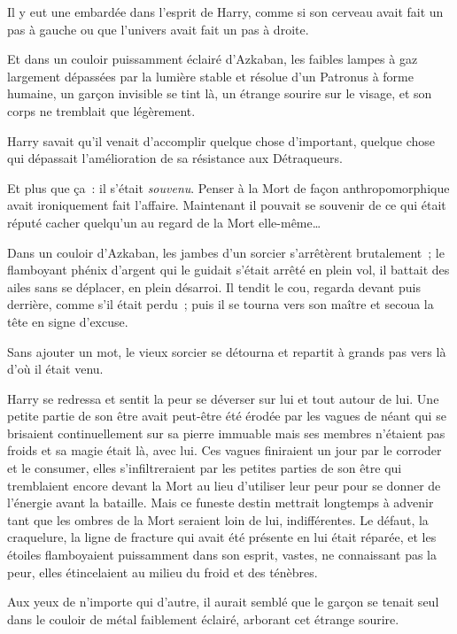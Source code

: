 Il y eut une embardée dans l'esprit de Harry, comme si son cerveau avait fait un pas à gauche ou que l'univers avait fait un pas à droite.

Et dans un couloir puissamment éclairé d'Azkaban, les faibles lampes à gaz largement dépassées par la lumière stable et résolue d'un Patronus à forme humaine, un garçon invisible se tint là, un étrange sourire sur le visage, et son corps ne tremblait que légèrement.

Harry savait qu'il venait d'accomplir quelque chose d'important, quelque chose qui dépassait l'amélioration de sa résistance aux Détraqueurs.

Et plus que ça~: il s'était \emph{souvenu}.
Penser à la Mort de façon anthropomorphique avait ironiquement fait l'affaire.
Maintenant il pouvait se souvenir de ce qui était réputé cacher quelqu'un au regard de la Mort elle-même…

\later

Dans un couloir d'Azkaban, les jambes d'un sorcier s'arrêtèrent brutalement~; le flamboyant phénix d'argent qui le guidait s'était arrêté en plein vol, il battait des ailes sans se déplacer, en plein désarroi.
Il tendit le cou, regarda devant puis derrière, comme s'il était perdu~; puis il se tourna vers son maître et secoua la tête en signe d'excuse.

Sans ajouter un mot, le vieux sorcier se détourna et repartit à grands pas vers là d'où il était venu.

\later

Harry se redressa et sentit la peur se déverser sur lui et tout autour de lui.
Une petite partie de son être avait peut-être été érodée par les vagues de néant qui se brisaient continuellement sur sa pierre immuable mais ses membres n'étaient pas froids et sa magie était là, avec lui.
Ces vagues finiraient un jour par le corroder et le consumer, elles s'infiltreraient par les petites parties de son être qui tremblaient encore devant la Mort au lieu d'utiliser leur peur pour se donner de l'énergie avant la bataille.
Mais ce funeste destin mettrait longtemps à advenir tant que les ombres de la Mort seraient loin de lui, indifférentes.
Le défaut, la craquelure, la ligne de fracture qui avait été présente en lui était réparée, et les étoiles flamboyaient puissamment dans son esprit, vastes, ne connaissant pas la peur, elles étincelaient au milieu du froid et des ténèbres.

Aux yeux de n'importe qui d'autre, il aurait semblé que le garçon se tenait seul dans le couloir de métal faiblement éclairé, arborant cet étrange sourire.

